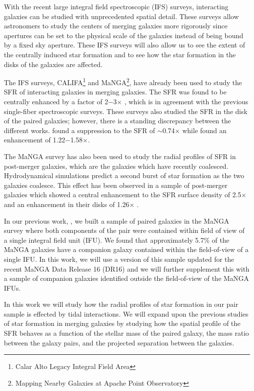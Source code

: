 \documentclass[iop,revtex4,twocolumn,apj,numberedappendix,appendixfloats]{emulateapj}
\begin{document}
With the recent large integral field spectroscopic (IFS) surveys, interacting galaxies can be studied with unprecedented spatial detail. These surveys allow astronomers to study the centers of merging galaxies more rigorously since apertures can be set to the physical scale of the galaxies instead of being bound by a fixed sky aperture. These IFS surveys will also allow us to see the extent of the centrally induced star formation and to see how the star formation in the disks of the galaxies are affected. 

The IFS surveys, CALIFA\footnote{Calar Alto Legacy Integral Field Area} and MaNGA\footnote{Mapping Nearby Galaxies at Apache Point Observatory}, have already been used to study the SFR of interacting galaxies in merging galaxies. The SFR was found to be centrally enhanced by a factor of 2$-$3$\times$ \citep{Barrera-Ballesteros:2015, Pan:2019}, which is in agreement with the previous single-fiber spectroscopic surveys. These surveys also studied the SFR in the disk of the paired galaxies; however, there is a standing discrepancy between the different works. \citet{Barrera-Ballesteros:2015} found a suppression to the SFR of $\sim$0.74$\times$ while \citet{Pan:2019} found an enhancement of 1.22$-$1.58$\times$. 

The MaNGA survey has also been used to study the radial profiles of SFR in post-merger galaxies, which are the galaxies which have recently coalesced. Hydrodynamical simulations predict a second burst of star formation as the two galaxies coalesce. This effect has been observed in a sample of post-merger galaxies which showed a central enhancement to the SFR surface density of 2.5$\times$ and an enhancement in their disks of 1.26$\times$ \citep{Thorp:2019}.

In our previous work, \citet{Fu:2018}, we built a sample of paired galaxies in the MaNGA survey where both components of the pair were contained within field of view of a single integral field unit (IFU). We found that approximately 5.7\% of the MaNGA galaxies have a companion galaxy contained within the field-of-view of a single IFU. In this work, we will use a version of this sample updated for the recent MaNGA Data Release 16 (DR16) and we will further supplement this with a sample of companion galaxies identified outside the field-of-view of the MaNGA IFUs. 

In this work we will study how the radial profiles of star formation in our pair sample is effected by tidal interactions. We will expand upon the previous studies of star formation in merging galaxies by studying how the spatial profile of the SFR behaves as a function of the stellar mass of the paired galaxy, the mass ratio between the galaxy pairs, and the projected separation between the galaxies. 
\end{document}
